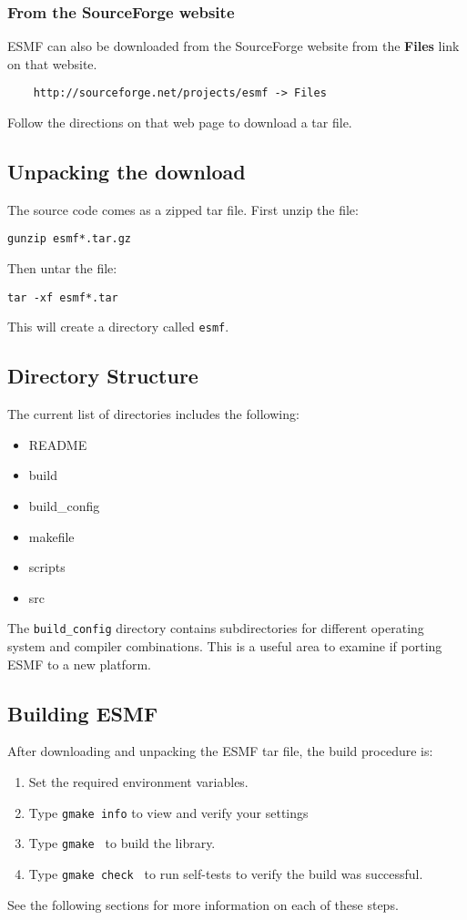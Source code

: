 \subsubsection{From the SourceForge website}
ESMF can also be downloaded from the SourceForge website
from the {\bf Files} link on that website.
\begin{verbatim}
    http://sourceforge.net/projects/esmf -> Files
\end{verbatim}
Follow the directions on that web page to download a tar file.  

\subsection{Unpacking the download}
The source code comes as a zipped tar file. First unzip the file:
\begin{verbatim}
gunzip esmf*.tar.gz
\end{verbatim}

Then untar the file:
\begin{verbatim}
tar -xf esmf*.tar
\end{verbatim}

This will create a directory called {\tt esmf}.

\subsection{Directory Structure}
The current list of directories includes the following:
\begin{itemize}
\item README
\item build
\item build\_config
\item makefile
\item scripts
\item src
\end{itemize}

The {\tt build\_config} directory contains subdirectories for
different operating system and compiler combinations. This is
a useful area to examine if porting ESMF to a new platform.

\subsection{Building ESMF}

After downloading and unpacking the ESMF tar file, the build procedure is:
\begin{enumerate}
\item Set the required environment variables. 
\item Type {\tt gmake info} to view and verify your settings
\item Type {\tt gmake } to build the library.
\item Type {\tt gmake check } to run self-tests to verify
the build was successful.
\end{enumerate}
See the following sections for more information on each of these steps.

